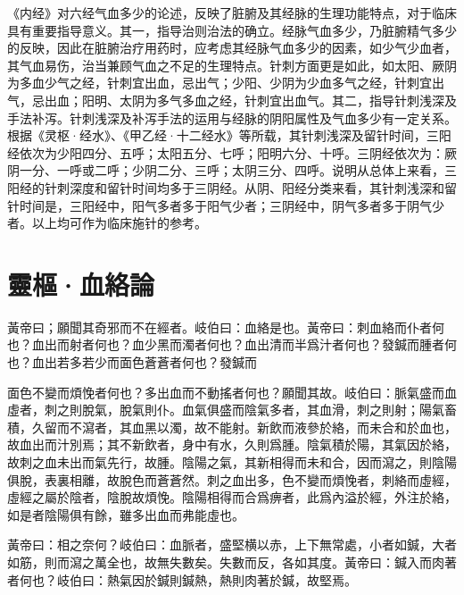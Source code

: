 \documentclass[12pt]{ctexbook}%
\begin{document}


《内经》对六经气血多少的论述，反映了脏腑及其经脉的生理功能特点，对于临床具有重要指导意义。其一，指导治则治法的确立。经脉气血多少，乃脏腑精气多少的反映，因此在脏腑治疗用药时，应考虑其经脉气血多少的因素，如少气少血者，其气血易伤，治当兼顾气血之不足的生理特点。针刺方面更是如此，如太阳、厥阴为多血少气之经，针刺宜出血，忌出气；少阳、少阴为少血多气之经，针刺宜出气，忌出血；阳明、太阴为多气多血之经，针刺宜出血气。其二，指导针刺浅深及手法补泻。针刺浅深及补泻手法的运用与经脉的阴阳属性及气血多少有一定关系。根据《灵枢·经水》、《甲乙经·十二经水》等所载，其针刺浅深及留针时间，三阳经依次为少阳四分、五呼；太阳五分、七呼；阳明六分、十呼。三阴经依次为：厥阴一分、一呼或二呼；少阴二分、三呼；太阴三分、四呼。说明从总体上来看，三阳经的针刺深度和留针时间均多于三阴经。从阴、阳经分类来看，其针刺浅深和留针时间是，三阳经中，阳气多者多于阳气少者；三阴经中，阴气多者多于阴气少者。以上均可作为临床施针的参考。

\section{靈樞·血絡論}%


\begin{yuanwen}
黃帝曰；願聞其奇邪而不在經者。岐伯曰：血絡是也。黃帝曰：刺血絡而仆者何也？血出而射者何也？血少黑而濁者何也？血出清而半爲汁者何也？發鍼而腫者何也？血出若多若少而面色蒼蒼者何也？發鍼而

面色不變而煩悗者何也？多出血而不動搖者何也？願聞其故。岐伯曰：脈氣盛而血虛者，刺之則脫氣，脫氣則仆。血氣俱盛而陰氣多者，其血滑，刺之則射；陽氣畜積，久留而不瀉者，其血黑以濁，故不能射。新飲而液參於絡，而未合和於血也，故血出而汁別焉；其不新飲者，身中有水，久則爲腫。陰氣積於陽，其氣因於絡，故刺之血未出而氣先行，故腫。陰陽之氣，其新相得而未和合，因而瀉之，則陰陽俱脫，表裏相離，故脫色而蒼蒼然。刺之血出多，色不變而煩悗者，刺絡而虛經，虛經之屬於陰者，陰脫故煩悗。陰陽相得而合爲痹者，此爲內溢於經，外注於絡，如是者陰陽俱有餘，雖多出血而弗能虛也。

黃帝曰：相之奈何？岐伯曰：血脈者，盛堅横以赤，上下無常處，小者如鍼，大者如筋，則而瀉之萬全也，故無失數矣。失數而反，各如其度。黃帝曰：鍼入而肉著者何也？岐伯曰：熱氣因於鍼則鍼熱，熱則肉著於鍼，故堅焉。
\end{yuanwen}
\end{document}
